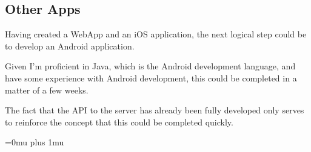 \documentclass[12pt]{article}
\begin{document}
\subsection{Other Apps}

Having created a WebApp and an iOS application, the next logical step could be to develop an Android application. 

Given I'm proficient in Java, which is the Android development language, and have some experience with Android development, this could be completed in a matter of a few weeks. 

The fact that the API to the server has already been fully developed only serves to reinforce the concept that this could be completed quickly. 


\newpage

\Urlmuskip=0mu plus 1mu



\newpage
\end{document}
